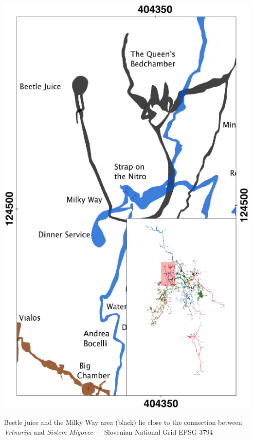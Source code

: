 \begin{marginfigure}
\checkoddpage \ifoddpage \forcerectofloat \else \forceversofloat \fi
\centering
\includegraphics[width=\textwidth]{2013/tetley-sam-2013/beetlejuice_inset.pdf}
\caption{Beetle juice and the Milky Way area (black) lie close to the connection between \emph{Vrtnarija} and \emph{Sistem Migovec} --- Slovenian National Grid EPSG 3794 }
\label{small inset}
\end{marginfigure}

